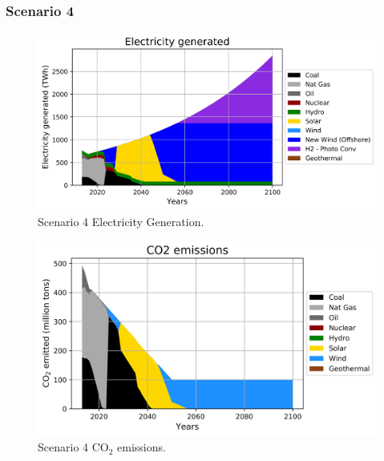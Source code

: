 \begin{frame}
  \frametitle{Scenario 4}
  \begin{figure}[htbp!]
    \begin{center}
      \includegraphics[scale=0.6]{./images/i2cner_nonuc_elc}
    \end{center}
          \caption{Scenario 4 Electricity Generation.}
    \label{s4e}
  \end{figure}
\end{frame}

\begin{frame}
  \begin{figure}[htbp!]
    \begin{center}
      \includegraphics[scale=0.6]{./images/i2cner_nonuc_co2}
    \end{center}
          \caption{Scenario 4 CO$_2$ emissions.}
    \label{s4c}
  \end{figure}

\end{frame}
